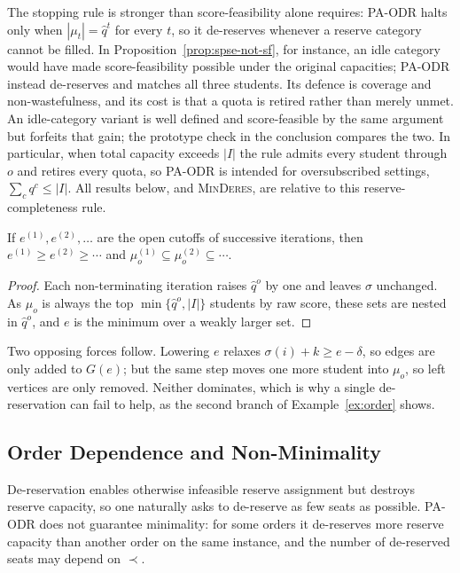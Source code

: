 \documentclass[runningheads]{llncs}
\begin{document}
\begin{nremark}
\label{sec:trigger}
The stopping rule is stronger than score-feasibility alone requires: PA-ODR halts only when $|\mu_t|=\hat q^t$ for every $t$, so it de-reserves whenever a reserve category cannot be filled. In Proposition~\ref{prop:spse-not-sf}, for instance, an idle category would have made score-feasibility possible under the original capacities; PA-ODR instead de-reserves and matches all three students. Its defence is coverage and non-wastefulness, and its cost is that a quota is retired rather than merely unmet. An idle-category variant is well defined and score-feasible by the same argument but forfeits that gain; the prototype check in the conclusion compares the two. In particular, when total capacity exceeds $|I|$ the rule admits every student through $o$ and retires every quota, so PA-ODR is intended for oversubscribed settings, $\sum_{c}q^c\le|I|$. All results below, and \textsc{MinDeres}, are relative to this reserve-completeness rule.
\end{nremark}

\begin{lemma}
\label{lem:monotone}
If $e^{(1)},e^{(2)},\dots$ are the open cutoffs of successive iterations, then $e^{(1)}\ge e^{(2)}\ge\cdots$ and $\mu_o^{(1)}\subseteq\mu_o^{(2)}\subseteq\cdots$.
\end{lemma}

\begin{proof}
Each non-terminating iteration raises $\hat q^o$ by one and leaves $\sigma$ unchanged. As $\mu_o$ is always the top $\min\{\hat q^o,|I|\}$ students by raw score, these sets are nested in $\hat q^o$, and $e$ is the minimum over a weakly larger set.
\end{proof}

Two opposing forces follow. Lowering $e$ relaxes $\sigma(i)+k\ge e-\delta$, so edges are only added to $G(e)$; but the same step moves one more student into $\mu_o$, so left vertices are only removed. Neither dominates, which is why a single de-reservation can fail to help, as the second branch of Example~\ref{ex:order} shows.

\subsection{Order Dependence and Non-Minimality}
\label{sec:order}

De-reservation enables otherwise infeasible reserve assignment but destroys reserve capacity, so one naturally asks to de-reserve as few seats as possible. PA-ODR does not guarantee minimality: for some orders it de-reserves more reserve capacity than another order on the same instance, and the number of de-reserved seats may depend on $\prec$.
\end{document}
